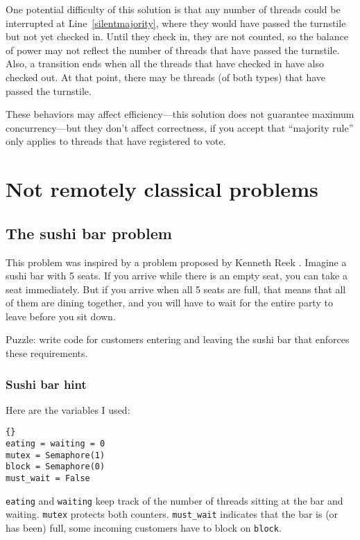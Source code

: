 \documentclass{book}
\newcommand{\clearemptydoublepage}{\newpage\cleardoublepage}
\begin{document}
One potential difficulty of this solution is that any number
of threads could be interrupted at Line~\ref{silentmajority},
where they would have passed the turnstile but not yet checked in.
Until they check in, they are not counted, so the balance of
power may not reflect the number of threads that have passed the
turnstile.  Also, a transition ends when all the threads that have
checked in have also checked out.  At that point, there may
be threads (of both types) that have passed the turnstile.

These behaviors may affect efficiency---this solution does
not guarantee maximum concurrency---but they don't affect
correctness, if you accept that ``majority rule'' only applies
to threads that have registered to vote.


\clearemptydoublepage
\chapter{Not remotely classical problems}


\section{The sushi bar problem}

This problem was inspired by a problem proposed by Kenneth Reek \cite{reek}.
Imagine a sushi bar with 5 seats.  If you arrive while there is an
empty seat, you can take a seat immediately.  But if you arrive when
all 5 seats are full, that means that all of them are dining together,
and you will have to wait for the entire party to leave before you
sit down.

Puzzle: write code for customers entering and
leaving the sushi bar that enforces these requirements.

\clearemptydoublepage
\subsection {Sushi bar hint}

Here are the variables I used:

\begin{lstlisting}[title={Sushi bar hint}]{}
eating = waiting = 0
mutex = Semaphore(1)
block = Semaphore(0)
must_wait = False
\end{lstlisting}

{\tt eating} and {\tt waiting} keep track of the number of
threads sitting at the bar and waiting.  {\tt mutex} protects
both counters.  {\tt must\_wait} indicates that the bar is (or
has been) full, some incoming customers have to block
on {\tt block}.
\end{document}
